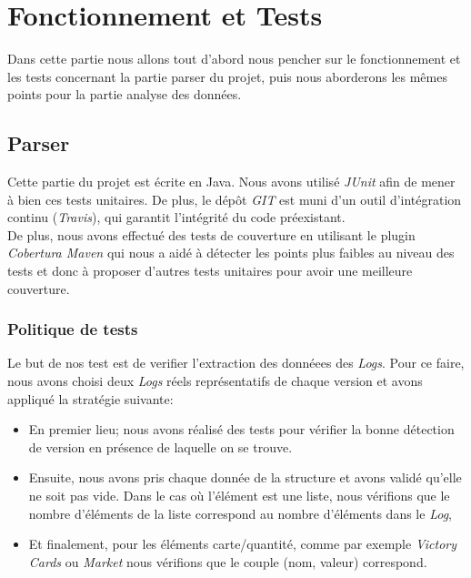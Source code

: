 \chapter{Fonctionnement et Tests}

Dans cette partie nous allons tout d'abord nous pencher sur le fonctionnement et les tests concernant la partie parser du projet, puis nous aborderons les mêmes points pour la partie analyse des données.

\section{Parser}

Cette partie du projet est écrite en Java. Nous avons utilisé \textit{JUnit} afin de mener à bien ces tests unitaires. De plus, le dépôt \textit{GIT} est muni d'un outil d'intégration continu (\textit{Travis}), qui garantit l'intégrité du code préexistant.\\

De plus, nous avons effectué des tests de couverture en utilisant le plugin \textit{Cobertura Maven} qui nous a aidé à détecter les points plus faibles au niveau des tests et donc à proposer d'autres tests unitaires pour avoir une meilleure couverture.


\subsection{Politique de tests}

Le but de nos test est de verifier l'extraction des donnéees des \textit{Logs}. Pour ce faire, nous avons choisi deux \textit{Logs} réels représentatifs de chaque version et avons appliqué la stratégie suivante:  \\
\begin{itemize}
\item En premier lieu; nous avons réalisé des tests pour vérifier la bonne détection de version en présence de laquelle on se trouve.
\item Ensuite, nous avons pris chaque donnée de la structure et avons validé qu'elle ne soit pas vide. Dans le cas où l'élément est une liste, nous vérifions que le nombre d'éléments de la liste correspond au nombre d'éléments dans le \textit{Log}, 
\item Et finalement, pour les éléments carte/quantité, comme par exemple \textit{Victory Cards} ou \textit{Market} nous vérifions que le couple (nom, valeur) correspond.
\end{itemize}


